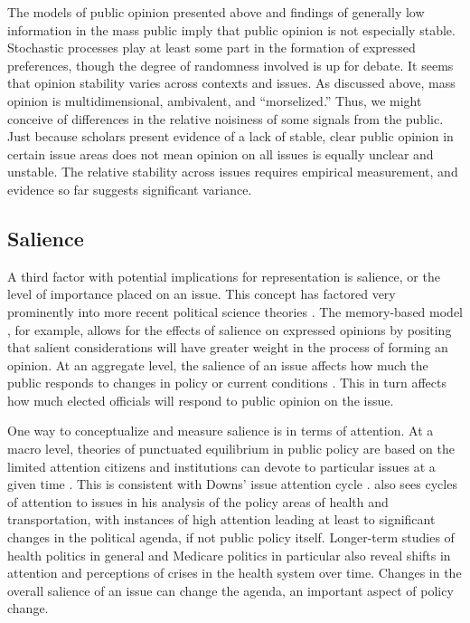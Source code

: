 The models of public opinion presented above and findings of generally low information in the mass public imply that public opinion is not especially stable. Stochastic processes play at least some part in the formation of expressed preferences, though the degree of randomness involved is up for debate. It seems that opinion stability varies across contexts and issues. As discussed above, mass opinion is multidimensional, ambivalent, and ``morselized.'' Thus, we might conceive of differences in the relative noisiness of some signals from the public. Just because scholars present evidence of a lack of stable, clear public opinion in certain issue areas does not mean opinion on all issues is equally unclear and unstable. The relative stability across issues requires empirical measurement, and evidence so far suggests significant variance.

\subsection*{Salience}
A third factor with potential implications for representation is salience, or the level of importance placed on an issue. This concept has factored very prominently into more recent political science theories \citep{Burstein2003}. The memory-based model \citep{Zaller1992a}, for example, allows for the effects of salience on expressed opinions by positing that salient considerations will have greater weight in the process of forming an opinion. At an aggregate level, the salience of an issue affects how much the public responds to changes in policy or current conditions \citep{Soroka2010}. This in turn affects how much elected officials will respond to public opinion on the issue.

One way to conceptualize and measure salience is in terms of attention. At a macro level, theories of punctuated equilibrium in public policy are based on the limited attention citizens and institutions can devote to particular issues at a given time \citep{Jones2005,True1999}. This is consistent with Downs' issue attention cycle \citeyearpar{Downs1972}. \citet{Kingdon1995} also sees cycles of attention to issues in his analysis of the policy areas of health and transportation, with instances of high attention leading at least to significant changes in the political agenda, if not public policy itself. Longer-term studies of health politics in general \citep{Starr1982,Starr2011} and Medicare politics in particular \citep{Oberlander2003,Marmor1970} also reveal shifts in attention and perceptions of crises in the health system over time. Changes in the overall salience of an issue can change the agenda, an important aspect of policy change.

